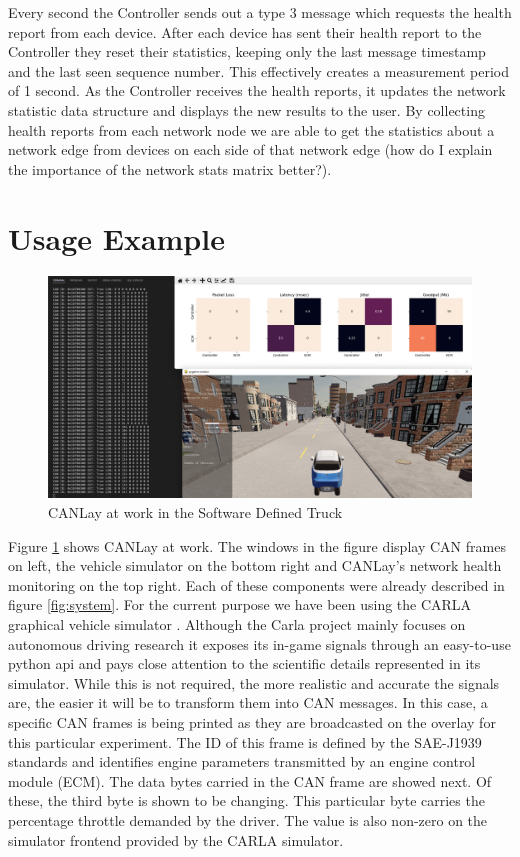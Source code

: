 \documentclass[letterpaper,twocolumn,12pt]{article}
\begin{document}
Every second the Controller sends out a type 3 message which requests the health report from each device. After each device has sent their health report to the Controller they reset their statistics, keeping only the last message timestamp and the last seen sequence number. This effectively creates a measurement period of 1 second. As the Controller receives the health reports, it updates the network statistic data structure and displays the new results to the user. By collecting health reports from each network node we are able to get the statistics about a network edge from devices on each side of that network edge (how do I explain the importance of the network stats matrix better?).


\section{Usage Example}\label{sec:usage}
\begin{figure}[t!]
    \centering
    \includegraphics[width=\linewidth]{images/escar_paper_screenshot_all_3 - Copy.png}
    \caption{CANLay at work in the Software Defined Truck}
    \label{fig:usabiity}
\end{figure}
Figure \ref{fig:usabiity} shows CANLay at work. The windows in the figure display CAN frames on left, the vehicle simulator on the bottom right and CANLay's network health monitoring on the top right. Each of these components were already described in figure \ref{fig:system}. For the current purpose we have been using the CARLA graphical vehicle simulator \cite{Dosovitskiy17}. 
Although the Carla project mainly focuses on autonomous driving research it exposes its in-game signals through an easy-to-use python api and pays close attention to the scientific details represented in its simulator. While this is not required, the more realistic and accurate the signals are, the easier it will be to transform them into CAN messages. In this case, a specific CAN frames is being printed as they are broadcasted on the overlay for this particular experiment. The ID of this frame is defined by the SAE-J1939 standards \cite{society_of_automotive_engineers_sae_nodate} and identifies engine parameters transmitted by an engine control module (ECM). The data bytes carried in the CAN frame are showed next. Of these, the third byte is shown to be changing. This particular byte carries the percentage throttle demanded by the driver. The value is also non-zero on the simulator frontend provided by the CARLA simulator.
\end{document}
